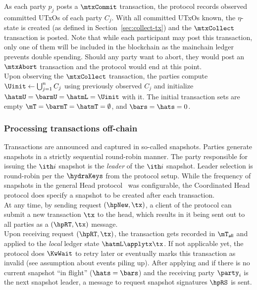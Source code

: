 \quad As each party $p_{j}$ posts a
$\mtxCommit$ transaction, the protocol records observed committed UTxOs of each
party $C_j$. With all committed UTxOs known, the $\eta$-state is created (as
defined in Section~\ref{sec:collect-tx}) and the $\mtxCollect$ transaction is
posted. Note that while each participant may post this transaction, only one of
them will be included in the blockchain as the mainchain ledger prevents double
spending. Should any party want to abort, they would post an $\mtxAbort$
transaction and the protocol would end at this point.\\

\quad Upon observing the $\mtxCollect$
transaction, the parties compute $\Uinit \gets \bigcup_{j=1}^{n} C_j$ using
previously observed $C_j$ and initialize $\hatmU = \barmU = \hatmL = \Uinit$
with it. The initial transaction sets are empty
$\mT = \barmT =\hatmT =\emptyset$, and $\bars = \hats = 0$.

\subsubsection{Processing transactions off-chain}

Transactions are announced and captured in so-called snapshots. Parties generate
snapshots in a strictly sequential round-robin manner. The party responsible for
issuing the $\ith i$ snapshot is the \emph{leader} of the $\ith i$ snapshot.
Leader selection is round-robin per the $\hydraKeys$ from the protocol setup.
While the frequency of snapshots in the general Head protocol~\cite{hydrahead20}
was configurable, the Coordinated Head protocol does specify a snapshot to be
created after each transaction.\\

\quad At any time, by sending request $(\hpNew,\tx)$, a
client of the protocol can submit a new transaction $\tx$ to the head, which
results in it being sent out to all parties as a $(\hpRT,\tx)$ message.\\

\quad Upon receiving request $(\hpRT,\tx)$, the transaction
gets recorded in $\mT_{\mathsf{all}}$ and applied to the \emph{local} ledger
state $\hatmL \applytx \tx$. If not applicable yet, the protocol does $\KwWait$
to retry later or eventually marks this transaction as invalid (see assumption
about events piling up). After applying and if there is no current snapshot ``in
flight'' ($\hats = \bars$) and the receiving party $\party_{i}$ is the next
snapshot
leader, a message to request snapshot signatures $\hpRS$ is sent. \\

